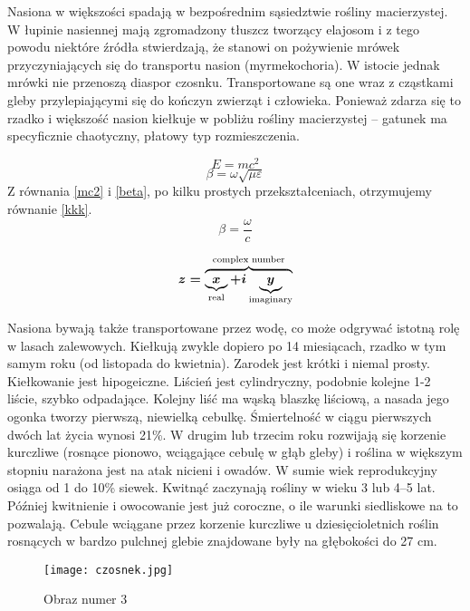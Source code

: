 Nasiona w większości spadają w bezpośrednim sąsiedztwie rośliny macierzystej. W łupinie nasiennej mają zgromadzony tłuszcz tworzący elajosom i z tego powodu niektóre źródła stwierdzają, że stanowi on pożywienie mrówek przyczyniających się do transportu nasion (myrmekochoria). W istocie jednak mrówki nie przenoszą diaspor czosnku. Transportowane są one wraz z cząstkami gleby przylepiającymi się do kończyn zwierząt i człowieka. Ponieważ zdarza się to rzadko i większość nasion kiełkuje w pobliżu rośliny macierzystej – gatunek ma specyficznie chaotyczny, płatowy typ rozmieszczenia.

\begin{equation} \label{mc2}
E = mc^2
\end{equation}
\begin{equation} \label{beta}
\beta = \omega\sqrt{\mu\varepsilon}
\end{equation}
Z równania \eqref{mc2} i \eqref{beta}, po kilku prostych przekształceniach, otrzymujemy równanie \eqref{kkk}.
\begin{equation} \label{kkk}
\beta = \frac{\omega}{c}
\end{equation}

\begin{equation} \label{test}
\boldmath
 z = \overbrace{
   \underbrace{x}_\text{real} + i
   \underbrace{y}_\text{imaginary}
  }^\text{complex number}
\end{equation}

Nasiona bywają także transportowane przez wodę, co może odgrywać istotną rolę w lasach zalewowych. Kiełkują zwykle dopiero po 14 miesiącach, rzadko w tym samym roku (od listopada do kwietnia). Zarodek jest krótki i niemal prosty. Kiełkowanie jest hipogeiczne. Liścień jest cylindryczny, podobnie kolejne 1-2 liście, szybko odpadające. Kolejny liść ma wąską blaszkę liściową, a nasada jego ogonka tworzy pierwszą, niewielką cebulkę. Śmiertelność w ciągu pierwszych dwóch lat życia wynosi 21\%. W drugim lub trzecim roku rozwijają się korzenie kurczliwe (rosnące pionowo, wciągające cebulę w głąb gleby) i roślina w większym stopniu narażona jest na atak nicieni i owadów. W sumie wiek reprodukcyjny osiąga od 1 do 10\% siewek. Kwitnąć zaczynają rośliny w wieku 3 lub 4–5 lat. Później kwitnienie i owocowanie jest już coroczne, o ile warunki siedliskowe na to pozwalają. Cebule wciągane przez korzenie kurczliwe u dziesięcioletnich roślin rosnących w bardzo pulchnej glebie znajdowane były na głębokości do 27 cm.

\begin{figure}[ht]
 \centering
 \texttt{[image: czosnek.jpg]}
 \caption{Obraz numer 3}
 \label{figure3}
\end{figure}

